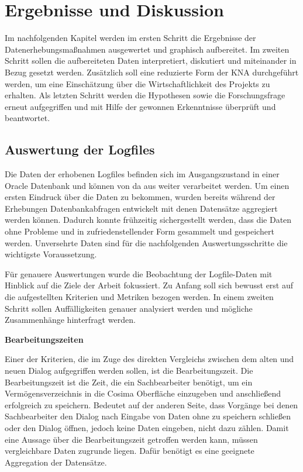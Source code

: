 \section{Ergebnisse und Diskussion}
\label{sec:ergebnisseUndDiskussion}
Im nachfolgenden Kapitel werden im ersten Schritt die Ergebnisse der Datenerhebungsmaßnahmen ausgewertet und graphisch aufbereitet. Im zweiten Schritt sollen die aufbereiteten Daten interpretiert, diskutiert und miteinander in Bezug gesetzt werden. Zusätzlich soll eine reduzierte Form der \gls{KNA} durchgeführt werden, um eine Einschätzung über die Wirtschaftlichkeit des Projekts zu erhalten. Als letzten Schritt werden die Hypothesen sowie die Forschungsfrage erneut aufgegriffen und mit Hilfe der gewonnen Erkenntnisse überprüft und beantwortet.  


\subsection{Auswertung der Logfiles}
\label{sec:auswertungDerLogfiles}
Die Daten der erhobenen Logfiles befinden sich im Ausgangszustand in einer Oracle Datenbank und können von da aus weiter verarbeitet werden. Um einen ersten Eindruck über die Daten zu bekommen, wurden bereits während der Erhebungen Datenbankabfragen entwickelt mit denen Datensätze aggregiert werden können. Dadurch konnte frühzeitig sichergestellt werden, dass die Daten ohne Probleme und in zufriedenstellender Form gesammelt und gespeichert werden. Unversehrte Daten sind für die nachfolgenden Auswertungsschritte die wichtigste Voraussetzung.

Für genauere Auswertungen wurde die Beobachtung der Logfile-Daten mit Hinblick auf die Ziele der Arbeit fokussiert. Zu Anfang soll sich bewusst erst auf die aufgestellten Kriterien und Metriken bezogen werden. In einem zweiten Schritt sollen Auffälligkeiten genauer analysiert werden und mögliche Zusammenhänge hinterfragt werden.

\textbf{Bearbeitungszeiten}

Einer der Kriterien, die im Zuge des direkten Vergleichs zwischen dem alten und neuen Dialog aufgegriffen werden sollen, ist die Bearbeitungszeit. Die Bearbeitungszeit ist die Zeit, die ein Sachbearbeiter benötigt, um ein Vermögensverzeichnis in die Cosima Oberfläche einzugeben und anschließend erfolgreich zu speichern. Bedeutet auf der anderen Seite, dass Vorgänge bei denen Sachbearbeiter den Dialog nach Eingabe von Daten ohne zu speichern schließen oder den Dialog öffnen, jedoch keine Daten eingeben, nicht dazu zählen. Damit eine Aussage über die Bearbeitungszeit getroffen werden kann, müssen vergleichbare Daten zugrunde liegen. Dafür benötigt es eine geeignete Aggregation der Datensätze.

